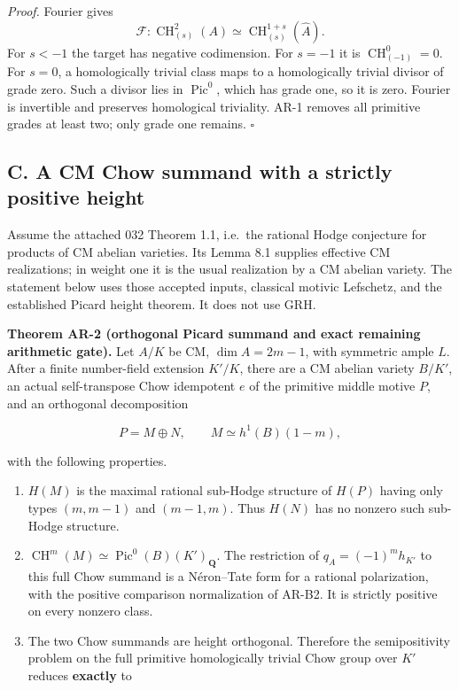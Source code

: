 \documentclass[11pt,a4paper]{article}
\providecommand{\tightlist}{\setlength{\itemsep}{0pt}\setlength{\parskip}{0pt}}
\begin{document}
\emph{Proof.} Fourier gives \[
\mathcal F:\operatorname{CH}^2_{(s)}(A)
 \simeq\operatorname{CH}^{1+s}_{(s)}(\widehat A).
\] For \(s<-1\) the target has negative codimension. For \(s=-1\) it is
\(\operatorname{CH}^0_{(-1)}=0\). For \(s=0\), a homologically trivial
class maps to a homologically trivial divisor of grade zero. Such a
divisor lies in \(\operatorname{Pic}^0\), which has grade one, so it is
zero. Fourier is invertible and preserves homological triviality. AR-1
removes all primitive grades at least two; only grade one remains.
\(\square\)

\subsection{C. A CM Chow summand with a strictly positive
height}\label{c.-a-cm-chow-summand-with-a-strictly-positive-height}

Assume the attached 032 Theorem 1.1, i.e.~the rational Hodge conjecture
for products of CM abelian varieties. Its Lemma 8.1 supplies effective
CM realizations; in weight one it is the usual realization by a CM
abelian variety. The statement below uses those accepted inputs,
classical motivic Lefschetz, and the established Picard height theorem.
It does not use GRH.

\textbf{Theorem AR-2 (orthogonal Picard summand and exact remaining
arithmetic gate).} Let \(A/K\) be CM, \(\dim A=2m-1\), with symmetric
ample \(L\). After a finite number-field extension \(K'/K\), there are a
CM abelian variety \(B/K'\), an actual self-transpose Chow idempotent
\(e\) of the primitive middle motive \(P\), and an orthogonal
decomposition

\[
P=M\oplus N,\qquad M\simeq h^1(B)(1-m),
\tag{AR.4}
\]

with the following properties.

\begin{enumerate}
\def\labelenumi{\arabic{enumi}.}
\tightlist
\item
  \(H(M)\) is the maximal rational sub-Hodge structure of \(H(P)\)
  having only types \((m,m-1)\) and \((m-1,m)\). Thus \(H(N)\) has no
  nonzero such sub-Hodge structure.
\item
  \(\operatorname{CH}^m(M)\simeq\operatorname{Pic}^0(B)(K')_{\mathbf Q}\).
  The restriction of \(q_A=(-1)^m h_{K'}\) to this full Chow summand is
  a Néron--Tate form for a rational polarization, with the positive
  comparison normalization of AR-B2. It is strictly positive on every
  nonzero class.
\item
  The two Chow summands are height orthogonal. Therefore the
  semipositivity problem on the full primitive homologically trivial
  Chow group over \(K'\) reduces \textbf{exactly} to
\end{enumerate}
\end{document}

